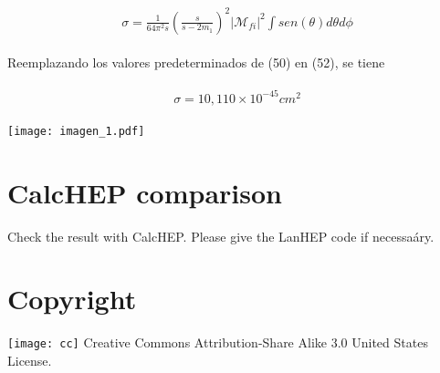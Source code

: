 \begin{gather}
\begin{split}
\sigma=\frac{1}{64\pi^2s}{(\frac{s}{s-2m_{1}})}^{2}{|\mathcal{M}_{fi}|}^{2}\int{sen(\theta)}d\theta d\phi
\end{split}
\end{gather}


Reemplazando los valores predeterminados de (50) en (52), se tiene

\begin{gather}
\begin{split}
\sigma=10,110\times10^{-45}{cm}^{2}
\end{split}
\end{gather}

\texttt{[image: imagen\_1.pdf]}

\section{CalcHEP comparison}

Check the result with CalcHEP. Please give the LanHEP code if necessaáry.

\section{Copyright}
\texttt{[image: cc]} Creative Commons Attribution-Share Alike 3.0 United States License.


